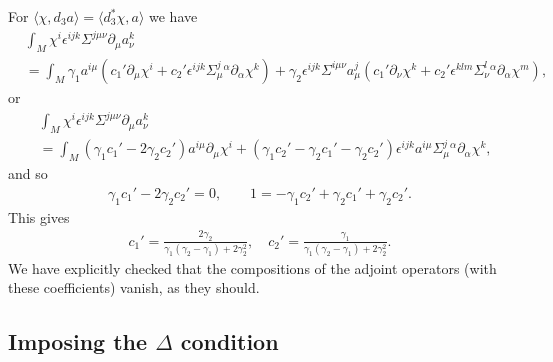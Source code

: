 \documentclass[10pt]{report}
\theoremstyle{definition}
\begin{document}
For $\langle \chi, d_3 a\rangle = \langle d_3^* \chi, a\rangle$ we have
\begin{align}
& \int_M  \chi^i  \epsilon^{ijk} \Sigma^{j\mu\nu} \partial_\mu a_\nu^k  \\ \nonumber & =\int_M 
\gamma_1 a^{i\mu} (c_1' \partial_\mu \chi^i + c_2' \epsilon^{ijk} \Sigma^j_\mu{}^\alpha \partial_\alpha \chi^k) + \gamma_2 \epsilon^{ijk} \Sigma^{i\mu\nu} a_\mu^j (c_1' \partial_\nu \chi^k + c_2' \epsilon^{klm} \Sigma^l_\nu{}^\alpha \partial_\alpha \chi^m), 
\end{align}
or 
\begin{align}
& \int_M  \chi^i  \epsilon^{ijk} \Sigma^{j\mu\nu} \partial_\mu a_\nu^k \\ \nonumber & = \int_M 
(\gamma_1 c_1' - 2 \gamma_2 c_2' ) a^{i\mu}  \partial_\mu \chi^i +  (\gamma_1 c_2'  - \gamma_2 c_1' - \gamma_2 c_2' ) \epsilon^{ijk} a^{i\mu} \Sigma^j_\mu{}^\alpha \partial_\alpha \chi^k ,
\end{align}
and so
\begin{align}
\gamma_1 c_1' - 2 \gamma_2 c_2' =0, \qquad 1  = -\gamma_1 c_2'  + \gamma_2 c_1' + \gamma_2 c_2' .
\end{align}
This gives
\begin{align}
c_1' = \frac{2\gamma_2}{\gamma_1(\gamma_2-\gamma_1) + 2\gamma_2^2}, \quad c_2' = \frac{\gamma_1}{\gamma_1(\gamma_2-\gamma_1) + 2\gamma_2^2}.
\end{align}
We have explicitly checked that the compositions of the adjoint operators (with these coefficients) vanish, as they should. 

 \subsection{Imposing the \texorpdfstring{$\Delta$}{} condition}
 
\end{document}
